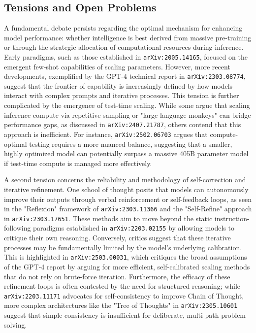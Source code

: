 \documentclass[11pt]{article}
\begin{document}
\subsection{Tensions and Open Problems}

A fundamental debate persists regarding the optimal mechanism for enhancing model performance: whether intelligence is best derived from massive pre-training or through the strategic allocation of computational resources during inference. Early paradigms, such as those established in \texttt{arXiv:2005.14165}, focused on the emergent few-shot capabilities of scaling parameters. However, more recent developments, exemplified by the GPT-4 technical report in \texttt{arXiv:2303.08774}, suggest that the frontier of capability is increasingly defined by how models interact with complex prompts and iterative processes. This tension is further complicated by the emergence of test-time scaling. While some argue that scaling inference compute via repetitive sampling or "large language monkeys" can bridge performance gaps, as discussed in \texttt{arXiv:2407.21787}, others contend that this approach is inefficient. For instance, \texttt{arXiv:2502.06703} argues that compute-optimal testing requires a more nuanced balance, suggesting that a smaller, highly optimized model can potentially surpass a massive 405B parameter model if test-time compute is managed more effectively.

A second tension concerns the reliability and methodology of self-correction and iterative refinement. One school of thought posits that models can autonomously improve their outputs through verbal reinforcement or self-feedback loops, as seen in the "Reflexion" framework of \texttt{arXiv:2303.11366} and the "Self-Refine" approach in \texttt{arXiv:2303.17651}. These methods aim to move beyond the static instruction-following paradigms established in \texttt{arXiv:2203.02155} by allowing models to critique their own reasoning. Conversely, critics suggest that these iterative processes may be fundamentally limited by the model's underlying calibration. This is highlighted in \texttt{arXiv:2503.00031}, which critiques the broad assumptions of the GPT-4 report by arguing for more efficient, self-calibrated scaling methods that do not rely on brute-force iteration. Furthermore, the efficacy of these refinement loops is often contested by the need for structured reasoning; while \texttt{arXiv:2203.11171} advocates for self-consistency to improve Chain of Thought, more complex architectures like the "Tree of Thoughts" in \texttt{arXiv:2305.10601} suggest that simple consistency is insufficient for deliberate, multi-path problem solving.
\end{document}
